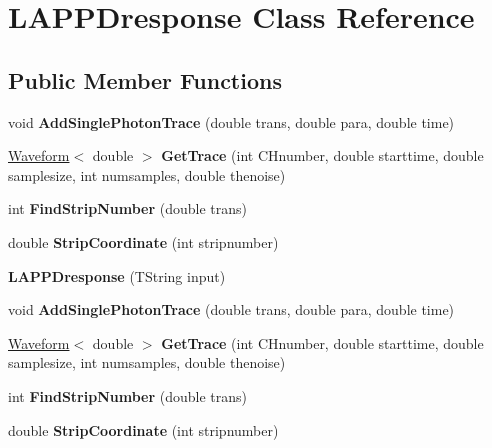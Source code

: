 \hypertarget{classLAPPDresponse}{
\section{LAPPDresponse Class Reference}
\label{classLAPPDresponse}
}
\subsection*{Public Member Functions}
\begin{DoxyCompactItemize}
\item 
\hypertarget{classLAPPDresponse_a5d53c8ca94cd0b1d2f389df41b3c71d0}{
void {\bfseries AddSinglePhotonTrace} (double trans, double para, double time)}
\label{classLAPPDresponse_a5d53c8ca94cd0b1d2f389df41b3c71d0}

\item 
\hypertarget{classLAPPDresponse_a6dc34922a8a63dc84fa2758ad7ae07f5}{
\hyperlink{classWaveform}{Waveform}$<$ double $>$ {\bfseries GetTrace} (int CHnumber, double starttime, double samplesize, int numsamples, double thenoise)}
\label{classLAPPDresponse_a6dc34922a8a63dc84fa2758ad7ae07f5}

\item 
\hypertarget{classLAPPDresponse_af7ea4eaf42b67cd816a1205c84e9756b}{
int {\bfseries FindStripNumber} (double trans)}
\label{classLAPPDresponse_af7ea4eaf42b67cd816a1205c84e9756b}

\item 
\hypertarget{classLAPPDresponse_a7006a41063a44bec116b5763dfd218ac}{
double {\bfseries StripCoordinate} (int stripnumber)}
\label{classLAPPDresponse_a7006a41063a44bec116b5763dfd218ac}

\item 
\hypertarget{classLAPPDresponse_ae5af516e249a30015990e31654de9f0f}{
{\bfseries LAPPDresponse} (TString input)}
\label{classLAPPDresponse_ae5af516e249a30015990e31654de9f0f}

\item 
\hypertarget{classLAPPDresponse_a5d53c8ca94cd0b1d2f389df41b3c71d0}{
void {\bfseries AddSinglePhotonTrace} (double trans, double para, double time)}
\label{classLAPPDresponse_a5d53c8ca94cd0b1d2f389df41b3c71d0}

\item 
\hypertarget{classLAPPDresponse_adcf4b1cb461f805e4f2b0106ad24a87d}{
\hyperlink{classWaveform}{Waveform}$<$ double $>$ {\bfseries GetTrace} (int CHnumber, double starttime, double samplesize, int numsamples, double thenoise)}
\label{classLAPPDresponse_adcf4b1cb461f805e4f2b0106ad24a87d}

\item 
\hypertarget{classLAPPDresponse_af7ea4eaf42b67cd816a1205c84e9756b}{
int {\bfseries FindStripNumber} (double trans)}
\label{classLAPPDresponse_af7ea4eaf42b67cd816a1205c84e9756b}

\item 
\hypertarget{classLAPPDresponse_a7006a41063a44bec116b5763dfd218ac}{
double {\bfseries StripCoordinate} (int stripnumber)}
\label{classLAPPDresponse_a7006a41063a44bec116b5763dfd218ac}

\end{DoxyCompactItemize}
